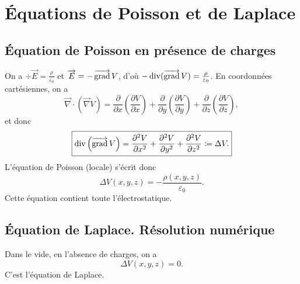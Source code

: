 \section{Équations de Poisson et de Laplace}

    \subsection{Équation de Poisson en présence de charges}

        On a $\div\vec{E}=\frac{\rho}{\varepsilon_0}$ et $\protect\overrightarrow{{E}}=-\operatorname{\overrightarrow{\text{grad}}} V$, d'où $-\operatorname{div}(\operatorname{\overrightarrow{\text{grad}}} V)=\frac{\rho}{\varepsilon_0}$. En coordonnées cartésiennes, on a 
        \begin{equation}
            \vec{\nabla}\cdot(\vec{\nabla}V)=\frac{\partial}{\partial x}\left(\frac{\partial V}{\partial x}\right)+\frac{\partial}{\partial y}\left(\frac{\partial V}{\partial y}\right)+\frac{\partial}{\partial z}\left(\frac{\partial V}{\partial z}\right),
        \end{equation}
        et donc 
        \begin{equation}
            \boxed{
                \operatorname{div}\left(\operatorname{\overrightarrow{\text{grad}}} V\right)=\frac{\partial^{2}V}{\partial x^{2}}+\frac{\partial^{2}V}{\partial y^{2}}+\frac{\partial^{2}V}{\partial z^{2}}\coloneqq\Delta V.
            }
        \end{equation}
        L'équation de Poisson (locale) s'écrit donc
        \begin{equation}
            \boxed{
                \Delta V(x,y,z)=-\frac{\rho(x,y,z)}{\varepsilon_0}.
            }
        \end{equation}
        Cette équation contient \og toute l'électrostatique\fg.

    \subsection{Équation de Laplace. Résolution numérique}

        Dans le vide, en l'absence de charges, on a 
        \begin{equation}
            \boxed{
                \Delta V(x,y,z)=0.
            }
        \end{equation}
        C'est l'équation de Laplace. 

